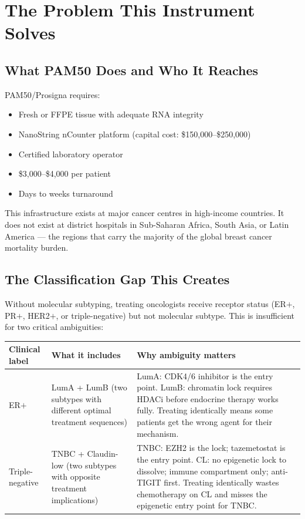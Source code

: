 \documentclass[12pt, a4paper]{article}
\begin{document}
\section{The Problem This Instrument Solves}

\subsection{What PAM50 Does and Who It Reaches}

PAM50/Prosigna requires:
\begin{itemize}
    \item Fresh or FFPE tissue with adequate
    RNA integrity
    \item NanoString nCounter platform (capital
    cost: \$150,000--\$250,000)
    \item Certified laboratory operator
    \item \$3,000--\$4,000 per patient
    \item Days to weeks turnaround
\end{itemize}

This infrastructure exists at major cancer
centres in high-income countries. It does not
exist at district hospitals in Sub-Saharan Africa,
South Asia, or Latin America --- the regions
that carry the majority of the global breast
cancer mortality burden.

\subsection{The Classification Gap This Creates}

Without molecular subtyping, treating oncologists
receive receptor status (ER$+$, PR$+$, HER2$+$, or
triple-negative) but not molecular subtype.
This is insufficient for two critical ambiguities:

\begin{center}
\begin{tabular}{p{3.5cm}p{4.5cm}p{4.5cm}}
\toprule
\textbf{Clinical label} &
\textbf{What it includes} &
\textbf{Why ambiguity matters} \\
\midrule
ER$+$ &
LumA + LumB (two subtypes with different
optimal treatment sequences) &
LumA: CDK4/6 inhibitor is the entry point.
LumB: chromatin lock requires HDACi before
endocrine therapy works fully. Treating
identically means some patients get the
wrong agent for their mechanism. \\[0.5em]
Triple-negative &
TNBC + Claudin-low (two subtypes with
opposite treatment implications) &
TNBC: EZH2 is the lock; tazemetostat is
the entry point.
CL: no epigenetic lock to dissolve; immune
compartment only; anti-TIGIT first.
Treating identically wastes chemotherapy
on CL and misses the epigenetic entry
point for TNBC. \\
\bottomrule
\end{tabular}
\end{center}
\end{document}
